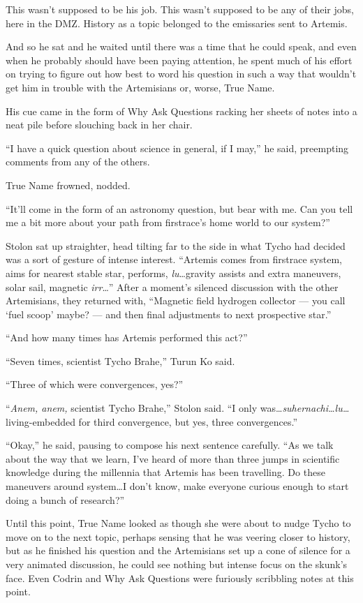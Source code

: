 This wasn't supposed to be his job. This wasn't supposed to be any of their jobs, here in the DMZ. History as a topic belonged to the emissaries sent to Artemis.

And so he sat and he waited until there was a time that he could speak, and even when he probably should have been paying attention, he spent much of his effort on trying to figure out how best to word his question in such a way that wouldn't get him in trouble with the Artemisians or, worse, True Name.

His cue came in the form of Why Ask Questions racking her sheets of notes into a neat pile before slouching back in her chair.

``I have a quick question about science in general, if I may,'' he said, preempting comments from any of the others.

True Name frowned, nodded.

``It'll come in the form of an astronomy question, but bear with me. Can you tell me a bit more about your path from firstrace's home world to our system?''

Stolon sat up straighter, head tilting far to the side in what Tycho had decided was a sort of gesture of intense interest. ``Artemis comes from firstrace system, aims for nearest stable star, performs, \emph{lu}\ldots gravity assists and extra maneuvers, solar sail, magnetic \emph{irr}\ldots{}'' After a moment's silenced discussion with the other Artemisians, they returned with, ``Magnetic field hydrogen collector — you call `fuel scoop' maybe? — and then final adjustments to next prospective star.''

``And how many times has Artemis performed this act?''

``Seven times, scientist Tycho Brahe,'' Turun Ko said.

``Three of which were convergences, yes?''

``\emph{Anem, anem,} scientist Tycho Brahe,'' Stolon said. ``I only was\ldots{}\emph{suhernachi\ldots lu\ldots{}} living-embedded for third convergence, but yes, three convergences.''

``Okay,'' he said, pausing to compose his next sentence carefully. ``As we talk about the way that we learn, I've heard of more than three jumps in scientific knowledge during the millennia that Artemis has been travelling. Do these maneuvers around system\ldots I don't know, make everyone curious enough to start doing a bunch of research?''

Until this point, True Name looked as though she were about to nudge Tycho to move on to the next topic, perhaps sensing that he was veering closer to history, but as he finished his question and the Artemisians set up a cone of silence for a very animated discussion, he could see nothing but intense focus on the skunk's face. Even Codrin and Why Ask Questions were furiously scribbling notes at this point.

